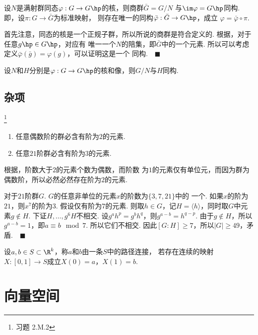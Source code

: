   \begin{thm}[群同构第一定理]
    设$N$是满射群同态$\varphi:G\to G\hp$的核，则商群$\bar{G}=G/N$
    与$\im\varphi=G\hp$同构. 即，设$\pi:G\to\bar{G}$为标准映射，
    则存在唯一的同构$\bar{\varphi}:\bar{G}\to G\hp$，成立
    $\varphi = \bar{\varphi}\circ\pi$.
  \end{thm}
  \proof
    首先注意，同态的核是一个正规子群，所以所说的商群是符合定义的.
    根据，对于任意$g\hp\in G\hp$，对应有
    唯一一个$N$的陪集，即$\bar{G}$中的一个元素. 所以可以考虑
    定义$\bar{\varphi}(\bar{g})=\varphi(g)$，可以证明这是一个
    同构.$\quad\blacksquare$

  \begin{cor}
    设$N$和$H$分别是$\varphi:G\to G\hp$的核和像，则$G/N$与$H$同构.
  \end{cor}

\subsection{杂项}

  \begin{pos}
    \footnote{习题 2.M.2}
    $\,$
    \begin{enumerate}
      \item 任意偶数阶的群必含有阶为$2$的元素.
      \item 任意$21$阶群必含有阶为$3$的元素.
    \end{enumerate}
  \end{pos}
  \proof
    根据，阶数大于$2$的元素个数为偶数，而阶数
    为$1$的元素仅有单位元，而因为群为偶数阶，所以必然必然存在阶为$2$的元素.
    \par
    对于$21$阶群$G$. $G$的任意非单位的元素$x$的阶数为$\{3,7,21\}$中的
    一个. 如果$x$的阶为$21$，则$x^7$的阶为$3$. 假设仅有阶为$7$的元素.
    则取$h\in G$，记$H=\langle h\rangle$，同时取$G$中元素$g\notin H$.
    下证$H,\dots,g^6H$不相交. 设$g^ah^p  = g^bh^q$，则$g^{a-b}=h^{q-p}$.
    由于$g\notin H$，所以$g^{a-b}=1$，即$a\equiv b\mod 7$. 所以它们不相交.
    因此$[G:H]\ge 7$，所以$|G|\ge 49$，矛盾.$\quad\blacksquare$

  \begin{defi}
    \label{defi: 路径连接}
    设$a,b\in S\subset\R^k$，称$a$和$b$由一条$S$中的路径连接，
    若存在连续的映射$X:[0,1]\to S$成立$X(0)=a$，$X(1)=b$.
  \end{defi}

\newpage
\section{向量空间}

